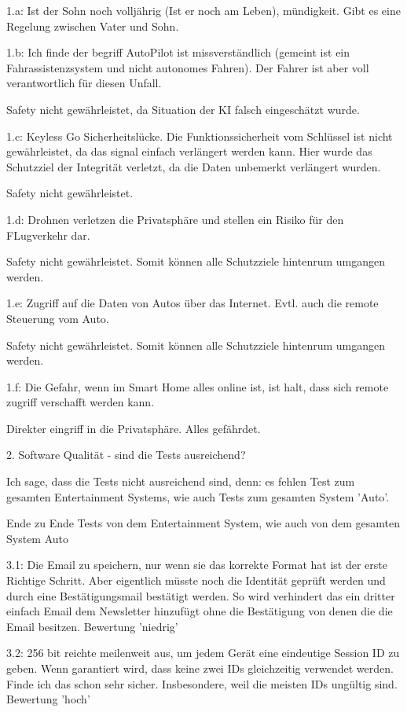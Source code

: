 \documentclass[a4paper]{article}
\begin{document}
1.a: Ist der Sohn noch volljährig (Ist er noch am Leben), mündigkeit. Gibt es eine Regelung zwischen Vater und Sohn.

1.b: Ich finde der begriff AutoPilot ist missverständlich (gemeint ist ein Fahrassistenzsystem und nicht autonomes Fahren). Der Fahrer ist aber voll verantwortlich für diesen Unfall.

Safety nicht gewährleistet, da Situation der KI falsch eingeschätzt wurde.

1.c: Keyless Go Sicherheitslücke. Die Funktionssicherheit vom Schlüssel ist nicht gewährleistet, da das signal einfach verlängert werden kann. Hier wurde das Schutzziel der Integrität verletzt, da die Daten unbemerkt verlängert wurden.

Safety nicht gewährleistet.

1.d: Drohnen verletzen die Privatsphäre und stellen ein Risiko für den FLugverkehr dar. 

Safety nicht gewährleistet. Somit können alle Schutzziele hintenrum umgangen werden.

1.e: Zugriff auf die Daten von Autos über das Internet. Evtl. auch die remote Steuerung vom Auto.

Safety nicht gewährleistet. Somit können alle Schutzziele hintenrum umgangen werden.

1.f: Die Gefahr, wenn im Smart Home alles online ist, ist halt, dass sich remote zugriff verschafft werden kann.

Direkter eingriff in die Privatsphäre. Alles gefährdet.

2. Software Qualität - sind die Tests ausreichend?

Ich sage, dass die Tests nicht ausreichend sind, denn: es fehlen Test zum gesamten Entertainment Systems, wie auch Tests zum gesamten System 'Auto'.

Ende zu Ende Tests von dem Entertainment System, wie auch von dem gesamten System Auto

3.1: Die Email zu speichern, nur wenn sie das korrekte Format hat ist der erste Richtige Schritt. Aber eigentlich müsste noch die Identität geprüft werden und durch eine Bestätigungsmail bestätigt werden. So wird verhindert das ein dritter einfach Email dem Newsletter hinzufügt ohne die Bestätigung von denen die die Email besitzen. Bewertung 'niedrig'

3.2: 256 bit reichte meilenweit aus, um jedem Gerät eine eindeutige Session ID zu geben. Wenn garantiert wird, dass keine zwei IDs gleichzeitig verwendet werden. Finde ich das schon sehr sicher. Insbesondere, weil die meisten IDs ungültig sind. Bewertung 'hoch'
\end{document}
